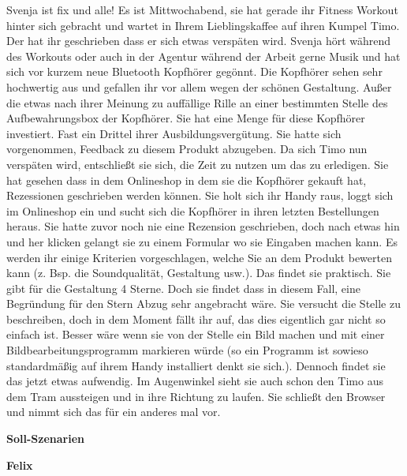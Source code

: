 Svenja ist fix und alle! Es ist Mittwochabend, sie hat gerade ihr Fitness Workout hinter sich gebracht
und wartet in Ihrem Lieblingskaffee auf ihren Kumpel Timo. Der hat ihr geschrieben dass er sich
etwas verspäten wird.
Svenja hört während des Workouts oder auch in der Agentur während der Arbeit gerne Musik und hat
sich vor kurzem neue Bluetooth Kopfhörer gegönnt. Die Kopfhörer sehen sehr hochwertig aus und
gefallen ihr vor allem wegen der schönen Gestaltung. Außer die etwas nach ihrer Meinung zu
auffällige Rille an einer bestimmten Stelle des Aufbewahrungsbox der Kopfhörer. Sie hat eine Menge
für diese Kopfhörer investiert. Fast ein Drittel ihrer Ausbildungsvergütung.
Sie hatte sich vorgenommen, Feedback zu diesem Produkt abzugeben. Da sich Timo nun verspäten
wird, entschließt sie sich, die Zeit zu nutzen um das zu erledigen. Sie hat gesehen dass in dem
Onlineshop in dem sie die Kopfhörer gekauft hat, Rezessionen geschrieben werden können. Sie holt
sich ihr Handy raus, loggt sich im Onlineshop ein und sucht sich die Kopfhörer in ihren letzten
Bestellungen heraus. Sie hatte zuvor noch nie eine Rezension geschrieben, doch nach etwas hin und
her klicken gelangt sie zu einem Formular wo sie Eingaben machen kann. Es werden ihr einige
Kriterien vorgeschlagen, welche Sie an dem Produkt bewerten kann (z. Bsp. die Soundqualität,
Gestaltung usw.). Das findet sie praktisch. Sie gibt für die Gestaltung 4 Sterne. Doch sie findet dass in
diesem Fall, eine Begründung für den Stern Abzug sehr angebracht wäre. Sie versucht die Stelle zu
beschreiben, doch in dem Moment fällt ihr auf, das dies eigentlich gar nicht so einfach ist. Besser
wäre wenn sie von der Stelle ein Bild machen und mit einer Bildbearbeitungsprogramm markieren
würde (so ein Programm ist sowieso standardmäßig auf ihrem Handy installiert denkt sie sich.).
Dennoch findet sie das jetzt etwas aufwendig. Im Augenwinkel sieht sie auch schon den Timo aus
dem Tram aussteigen und in ihre Richtung zu laufen. Sie schließt den Browser und nimmt sich das für
ein anderes mal vor.


\textbf{Soll-Szenarien}


\textbf{Felix}

